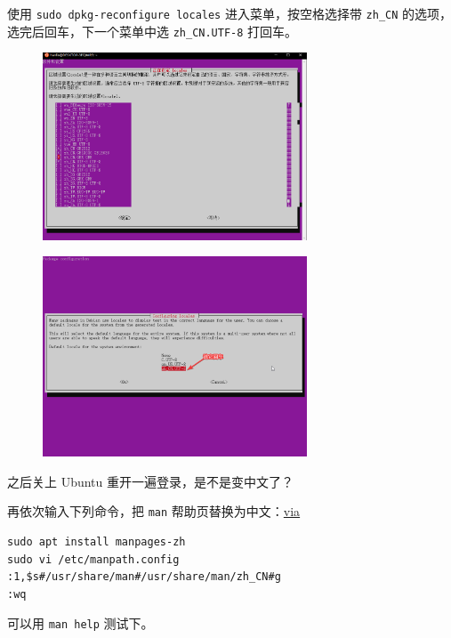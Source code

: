 使用 \texttt{sudo dpkg-reconfigure locales} 进入菜单，按空格选择带 \texttt{zh\_CN} 的选项，选完后回车，下一个菜单中选 \texttt{zh\_CN.UTF-8} 打回车。

\begin{figure}[htbp]
\centering
\includegraphics[width=0.7\textwidth]{docs/intro/images/WSL10.png} 

\end{figure}

\begin{figure}[htbp]
\centering
\includegraphics[width=0.7\textwidth]{docs/intro/images/WSL11.png} 

\end{figure}

 之后关上 Ubuntu 重开一遍登录，是不是变中文了？

再依次输入下列命令，把 \texttt{man} 帮助页替换为中文：\href{https://blog.csdn.net/qq_14989227/article/details/72954523}{via}

\begin{verbatim}
sudo apt install manpages-zh
sudo vi /etc/manpath.config
:1,$s#/usr/share/man#/usr/share/man/zh_CN#g
:wq
\end{verbatim}

 可以用 \texttt{man help} 测试下。

